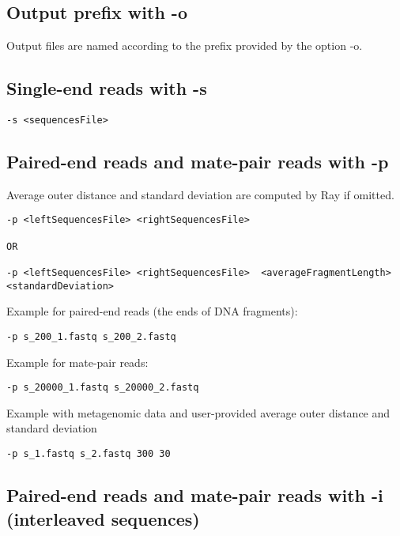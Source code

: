 \documentclass{article}
\begin{document}
\subsection{Output prefix with -o}

Output files are named according to the prefix provided by the option -o.

\subsection{Single-end reads with -s}

\begin{verbatim}
-s <sequencesFile>
\end{verbatim}

\subsection{Paired-end reads and mate-pair reads with -p}

Average outer distance and standard deviation are computed by Ray if omitted.

\begin{verbatim}
-p <leftSequencesFile> <rightSequencesFile>  

OR

-p <leftSequencesFile> <rightSequencesFile>  <averageFragmentLength> <standardDeviation> 
\end{verbatim}

Example for paired-end reads (the ends of DNA fragments):

\begin{verbatim}
-p s_200_1.fastq s_200_2.fastq
\end{verbatim}

Example for mate-pair reads:

\begin{verbatim}
-p s_20000_1.fastq s_20000_2.fastq
\end{verbatim}

Example with metagenomic data and user-provided average outer distance and standard deviation

\begin{verbatim}
-p s_1.fastq s_2.fastq 300 30
\end{verbatim}

\subsection{Paired-end reads and mate-pair reads with -i (interleaved sequences)}
\end{document}
